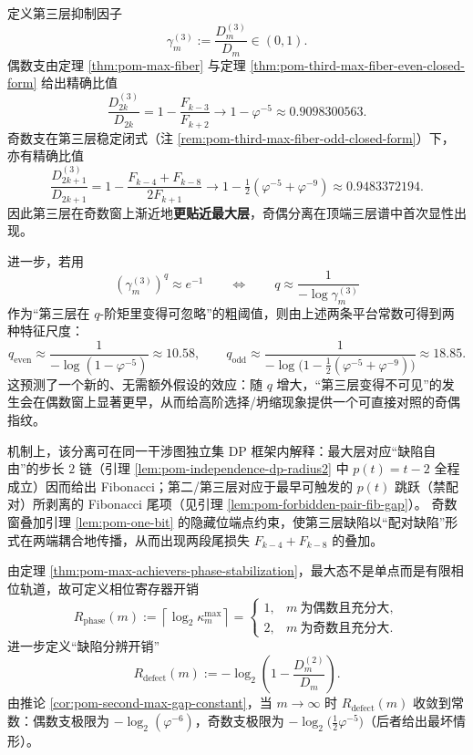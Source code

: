 \begin{remark}\label{rem:pom-third-max-gap-parity}
定义第三层抑制因子
\[
\gamma_m^{(3)}:=\frac{D_m^{(3)}}{D_m}\in(0,1).
\]
偶数支由定理 \ref{thm:pom-max-fiber} 与定理 \ref{thm:pom-third-max-fiber-even-closed-form} 给出精确比值
\[
\frac{D_{2k}^{(3)}}{D_{2k}}
=1-\frac{F_{k-3}}{F_{k+2}}
\longrightarrow
1-\varphi^{-5}
\approx 0.9098300563.
\]
奇数支在第三层稳定闭式（注 \ref{rem:pom-third-max-fiber-odd-closed-form}）下，亦有精确比值
\[
\frac{D_{2k+1}^{(3)}}{D_{2k+1}}
=1-\frac{F_{k-4}+F_{k-8}}{2F_{k+1}}
\longrightarrow
1-\tfrac12(\varphi^{-5}+\varphi^{-9})
\approx 0.9483372194.
\]
因此第三层在奇数窗上渐近地\textbf{更贴近最大层}，奇偶分离在顶端三层谱中首次显性出现。
\par
进一步，若用
\[
\left(\gamma_m^{(3)}\right)^q\approx e^{-1}
\qquad\Longleftrightarrow\qquad
q\approx \frac{1}{-\log \gamma_m^{(3)}}
\]
作为“第三层在 \(q\)-阶矩里变得可忽略”的粗阈值，则由上述两条平台常数可得到两种特征尺度：
\[
q_{\mathrm{even}}\approx \frac{1}{-\log(1-\varphi^{-5})}\approx 10.58,
\qquad
q_{\mathrm{odd}}\approx \frac{1}{-\log\bigl(1-\tfrac12(\varphi^{-5}+\varphi^{-9})\bigr)}\approx 18.85.
\]
这预测了一个新的、无需额外假设的效应：随 \(q\) 增大，“第三层变得不可见”的发生会在偶数窗上显著更早，从而给高阶选择/坍缩现象提供一个可直接对照的奇偶指纹。
\par
机制上，该分离可在同一干涉图独立集 DP 框架内解释：最大层对应“缺陷自由”的步长 \(2\) 链（引理 \ref{lem:pom-independence-dp-radius2} 中 \(p(t)=t-2\) 全程成立）因而给出 Fibonacci；第二/第三层对应于最早可触发的 \(p(t)\) 跳跃（禁配对）所剥离的 Fibonacci 尾项（见引理 \ref{lem:pom-forbidden-pair-fib-gap}）。
奇数窗叠加引理 \ref{lem:pom-one-bit} 的隐藏位端点约束，使第三层缺陷以“配对缺陷”形式在两端耦合地传播，从而出现两段尾损失 \(F_{k-4}+F_{k-8}\) 的叠加。
\end{remark}

\begin{remark}\label{rem:pom-phase-defect-resource-meters}
由定理 \ref{thm:pom-max-achievers-phase-stabilization}，最大态不是单点而是有限相位轨道，故可定义相位寄存器开销
\[
R_{\mathrm{phase}}(m):=\left\lceil \log_2 \kappa_m^{\mathrm{max}}\right\rceil
=
\begin{cases}
1,& m\ \text{为偶数且充分大},\\
2,& m\ \text{为奇数且充分大}.
\end{cases}
\]
进一步定义“缺陷分辨开销”
\[
R_{\mathrm{defect}}(m):=-\log_2\!\left(1-\frac{D_m^{(2)}}{D_m}\right).
\]
由推论 \ref{cor:pom-second-max-gap-constant}，当 \(m\to\infty\) 时 \(R_{\mathrm{defect}}(m)\) 收敛到常数：偶数支极限为 \(-\log_2(\varphi^{-6})\)，奇数支极限为 \(-\log_2\!\bigl(\tfrac12\varphi^{-5}\bigr)\)（后者给出最坏情形）。
\end{remark}

